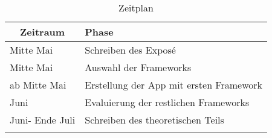 \documentclass[a4paper,11pt,german,public]{INSOexpose}
\begin{document}
\begin{spacing}{1.4}
\begin{longtable}{|p{.2 \linewidth}|p{.5 \linewidth}|}
	\hline
	\multicolumn{1}{|c|}{\textbf{Zeitraum}} & \textbf{Phase} \\ 
	\hline 
	Mitte Mai & Schreiben des Exposé \\ 
	\hline 
	Mitte Mai & Auswahl der Frameworks \\
	\hline 
	ab Mitte Mai & Erstellung der App mit ersten Framework \\
	\hline 
	Juni & Evaluierung der restlichen Frameworks \\
	\hline 
	Juni- Ende Juli & Schreiben des theoretischen Teils \\
	\hline
	\caption{Zeitplan}
	\label{tab:tabZeitplan}
\end{longtable}
\end{spacing}

\newpage
\nocite{dobjanschi:developing-android}
\nocite{tilko:rest}
\nocite{louis:android}
\nocite{stackOverflow:rest-client}
\nocite{burd:android}
\printbibliography
\end{document}
